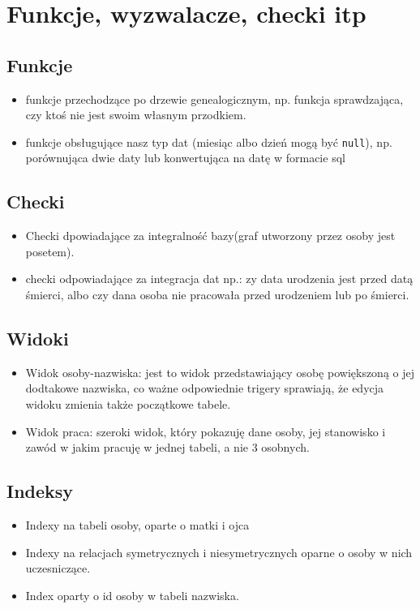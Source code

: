 \documentclass{article}
\begin{document}
\section{Funkcje, wyzwalacze, checki itp}

\subsection{Funkcje}
\begin{itemize}
\item funkcje przechodzące po drzewie genealogicznym, np. funkcja sprawdzająca, czy ktoś nie jest swoim własnym przodkiem.
\item funkcje obsługujące nasz typ dat (miesiąc albo dzień mogą być \texttt{null}), np. porównująca dwie daty lub konwertująca na datę w formacie sql
\end{itemize}

\subsection{Checki}

\begin{itemize}
\item Checki dpowiadające za integralność bazy(graf utworzony przez osoby jest posetem).
\item checki odpowiadające za integracja dat np.: zy data urodzenia jest przed datą śmierci, albo czy dana osoba nie pracowała przed urodzeniem lub po śmierci.
\end{itemize}
\subsection{Widoki}
\begin{itemize}
\item Widok osoby-nazwiska: jest to widok przedstawiający osobę powiększoną o jej dodtakowe nazwiska, co ważne odpowiednie trigery sprawiają, że edycja widoku zmienia także początkowe tabele.
\item Widok praca: szeroki widok, który pokazuję dane osoby, jej stanowisko i zawód w jakim pracuję w jednej tabeli, a nie 3 osobnych.
\end{itemize}
\subsection{Indeksy}
\begin{itemize}
\item Indexy na tabeli osoby, oparte o matki i ojca 
\item Indexy na relacjach symetrycznych i niesymetrycznych oparne o osoby w nich uczesniczące.
\item Index oparty o id osoby w tabeli nazwiska.
\end{itemize}
\end{document}
